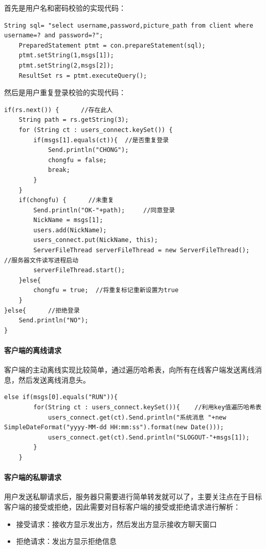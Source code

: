\documentclass[UTF8,12pt]{article}
\begin{document}
首先是用户名和密码校验的实现代码：
\begin{lstlisting}[title=用户名和密码校验,frame=shadowbox]
    String sql= "select username,password,picture_path from client where username=? and password=?";
    PreparedStatement ptmt = con.prepareStatement(sql);
    ptmt.setString(1,msgs[1]);
    ptmt.setString(2,msgs[2]);
    ResultSet rs = ptmt.executeQuery();
\end{lstlisting}

然后是用户重复登录校验的实现代码：
\begin{lstlisting}[title=用户重复登录校验,frame=shadowbox]
    if(rs.next()) {      //存在此人
    String path = rs.getString(3);
    for (String ct : users_connect.keySet()) {
        if(msgs[1].equals(ct)){  //是否重复登录
            Send.println("CHONG");
            chongfu = false;
            break;
        }
    }
    if(chongfu) {      //未重复
        Send.println("OK-"+path);     //同意登录
        NickName = msgs[1];
        users.add(NickName);
        users_connect.put(NickName, this);
        ServerFileThread serverFileThread = new ServerFileThread();  //服务器文件读写进程启动
        serverFileThread.start();
    }else{
        chongfu = true;  //将重复标记重新设置为true
    }
}else{      //拒绝登录
    Send.println("NO");
}
\end{lstlisting}

\paragraph{客户端的离线请求}
客户端的主动离线实现比较简单，通过遍历哈希表，向所有在线客户端发送离线消息，然后发送离线消息头。

\begin{lstlisting}[title=客户端的离线请求,frame=shadowbox]
    else if(msgs[0].equals("RUN")){
        for(String ct : users_connect.keySet()){    //利用key值遍历哈希表
            users_connect.get(ct).Send.println("系统消息 "+new SimpleDateFormat("yyyy-MM-dd HH:mm:ss").format(new Date()));
            users_connect.get(ct).Send.println("SLOGOUT-"+msgs[1]);
        }
    }
\end{lstlisting}

\paragraph{客户端的私聊请求}
用户发送私聊请求后，服务器只需要进行简单转发就可以了，主要关注点在于目标客户端的接受或拒绝，因此需要对目标客户端的接受或拒绝请求进行解析：
\begin{itemize}
    \item 接受请求：接收方显示发出方，然后发出方显示接收方聊天窗口
    \item 拒绝请求：发出方显示拒绝信息
\end{itemize}
\end{document}
